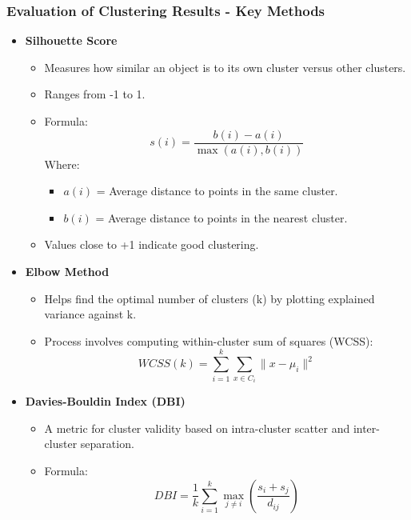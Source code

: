 \documentclass[aspectratio=169]{beamer}
\begin{document}
\begin{frame}[fragile]
    \frametitle{Evaluation of Clustering Results - Key Methods}
    \begin{itemize}
        \item \textbf{Silhouette Score}
        \begin{itemize}
            \item Measures how similar an object is to its own cluster versus other clusters.
            \item Ranges from -1 to 1.
            \item Formula:
            \begin{equation}
                s(i) = \frac{b(i) - a(i)}{\max(a(i), b(i))}
            \end{equation}
            Where:
            \begin{itemize}
                \item \(a(i)\) = Average distance to points in the same cluster.
                \item \(b(i)\) = Average distance to points in the nearest cluster.
            \end{itemize}
            \item Values close to +1 indicate good clustering.
        \end{itemize}

        \item \textbf{Elbow Method}
        \begin{itemize}
            \item Helps find the optimal number of clusters (k) by plotting explained variance against k.
            \item Process involves computing within-cluster sum of squares (WCSS):
            \begin{equation}
                WCSS(k) = \sum_{i=1}^{k} \sum_{x \in C_i} \| x - \mu_i \|^2
            \end{equation}
        \end{itemize}

        \item \textbf{Davies-Bouldin Index (DBI)}
        \begin{itemize}
            \item A metric for cluster validity based on intra-cluster scatter and inter-cluster separation.
            \item Formula:
            \begin{equation}
                DBI = \frac{1}{k} \sum_{i=1}^{k} \max_{j \neq i} \left( \frac{s_i + s_j}{d_{ij}} \right)
            \end{equation}
        \end{itemize}
    \end{itemize}
\end{frame}
\end{document}

